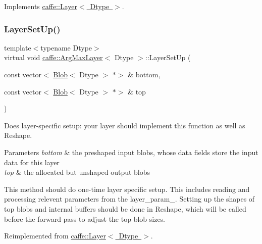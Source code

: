 Implements \mbox{\hyperlink{classcaffe_1_1_layer_a576ac6a60b1e99fe383831f52a6cea77}{caffe\+::\+Layer$<$ Dtype $>$}}.

\mbox{\label{classcaffe_1_1_arg_max_layer_a1251d1d407e8d15a83ba6807d013b97d}} 
\subsubsection{\texorpdfstring{Layer\+Set\+Up()}{LayerSetUp()}\hspace{0.1cm}{\footnotesize\ttfamily [1/2]}}
{\footnotesize\ttfamily template$<$typename Dtype$>$ \\
virtual void \mbox{\hyperlink{classcaffe_1_1_arg_max_layer}{caffe\+::\+Arg\+Max\+Layer}}$<$ Dtype $>$\+::Layer\+Set\+Up (\begin{DoxyParamCaption}\item[{const vector$<$ \mbox{\hyperlink{classcaffe_1_1_blob}{Blob}}$<$ Dtype $>$ $\ast$$>$ \&}]{bottom,  }\item[{const vector$<$ \mbox{\hyperlink{classcaffe_1_1_blob}{Blob}}$<$ Dtype $>$ $\ast$$>$ \&}]{top }\end{DoxyParamCaption})\hspace{0.3cm}{\ttfamily [virtual]}}



Does layer-\/specific setup\+: your layer should implement this function as well as Reshape. 


\begin{DoxyParams}{Parameters}
{\em bottom} & the preshaped input blobs, whose data fields store the input data for this layer \\
\hline
{\em top} & the allocated but unshaped output blobs\\
\hline
\end{DoxyParams}
This method should do one-\/time layer specific setup. This includes reading and processing relevent parameters from the {\ttfamily layer\+\_\+param\+\_\+}. Setting up the shapes of top blobs and internal buffers should be done in {\ttfamily Reshape}, which will be called before the forward pass to adjust the top blob sizes. 

Reimplemented from \mbox{\hyperlink{classcaffe_1_1_layer_a481323a3e0972c682787f2137468c29f}{caffe\+::\+Layer$<$ Dtype $>$}}.

